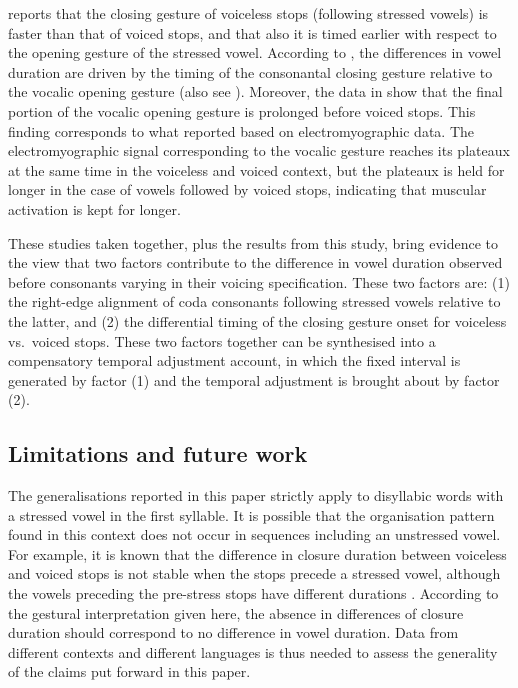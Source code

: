 \documentclass[preprint]{JASAnew}
\begin{document}
\citet{de-jong1991} reports that the closing gesture of voiceless stops
(following stressed vowels) is faster than that of voiced stops, and
that also it is timed earlier with respect to the opening gesture of the
stressed vowel. According to \citet{de-jong1991}, the differences in
vowel duration are driven by the timing of the consonantal closing
gesture relative to the vocalic opening gesture (also see
\citealt{hertrich1997}). Moreover, the data in \citet{de-jong1991} show
that the final portion of the vocalic opening gesture is prolonged
before voiced stops. This finding corresponds to what
\citet{raphael1975} reported based on electromyographic data. The
electromyographic signal corresponding to the vocalic gesture reaches
its plateaux at the same time in the voiceless and voiced context, but
the plateaux is held for longer in the case of vowels followed by voiced
stops, indicating that muscular activation is kept for longer.

These studies taken together, plus the results from this study, bring
evidence to the view that two factors contribute to the difference in
vowel duration observed before consonants varying in their voicing
specification. These two factors are: (1) the right-edge alignment of
coda consonants following stressed vowels relative to the latter, and
(2) the differential timing of the closing gesture onset for voiceless
vs.~voiced stops. These two factors together can be synthesised into a
compensatory temporal adjustment account, in which the fixed interval is
generated by factor (1) and the temporal adjustment is brought about by
factor (2).

\hypertarget{limitations-and-future-work}{%
\subsection{Limitations and future
work}\label{limitations-and-future-work}}

The generalisations reported in this paper strictly apply to disyllabic
words with a stressed vowel in the first syllable. It is possible that
the organisation pattern found in this context does not occur in
sequences including an unstressed vowel. For example, it is known that
the difference in closure duration between voiceless and voiced stops is
not stable when the stops precede a stressed vowel, although the vowels
preceding the pre-stress stops have different durations
\citep{davis1989}. According to the gestural interpretation given here,
the absence in differences of closure duration should correspond to no
difference in vowel duration. Data from different contexts and different
languages is thus needed to assess the generality of the claims put
forward in this paper.
\end{document}

